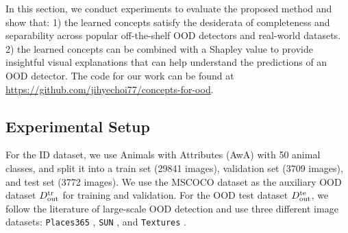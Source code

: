 In this section, we conduct experiments to evaluate the proposed method and show that: 1) the learned concepts satisfy the desiderata of completeness and separability across popular off-the-shelf OOD detectors and real-world datasets. 2) the learned concepts can be combined with a Shapley value to provide insightful visual explanations that can help understand the predictions of an OOD detector. 
The code for our work can be found at \url{https://github.com/jihyechoi77/concepts-for-ood}.

\subsection{Experimental Setup}
\label{sec:setup}

 For the ID dataset, we use Animals with Attributes (AwA) \citep{xian2018awa} with 50 animal classes, and split it into a train set (29841 images), validation set (3709 images), and test set (3772 images).
We use the MSCOCO dataset \citep{lin2014mscoco} as the auxiliary OOD dataset $D_{\textrm{out}}^{\textrm{tr}}$ for training and validation.
For the OOD test dataset $D_{\textrm{out}}^{\textrm{te}}$, we follow the literature of large-scale OOD detection \citep{Huang_MOS} and use three different image datasets: \texttt{Places365} \citep{zhou2017places}, \texttt{SUN} \citep{xiao2010sun}, and \texttt{Textures} \citep{cimpoi2014textures}.

